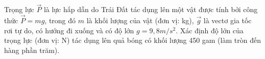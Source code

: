 \begin{question}[type=short_answer,difficulty=1,code={III-2}]
Trọng lực $\overrightarrow{P}$ là lực hấp dẫn do Trái Đất tác dụng lên một vật được tính bởi công thức $\overrightarrow{P}=mg$, trong đó $m$ là khối lượng của vật (đơn vị: kg), $\overrightarrow{g}$ là vectơ gia tốc rơi tự do, có hướng đi xuống và có độ lớn $g=9,8m/s^{2}$. Xác định độ lớn của trọng lực (đơn vị: N) tác dụng lên quả bóng có khối lượng 450 gam (làm tròn đến hàng phần trăm).


\end{question}